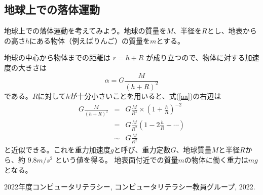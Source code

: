 \documentclass[platex,a4paper,12pt,dvipdfmx]{jsarticle}
\begin{document}
\subsection{地球上での落体運動}
地球上での落体運動を考えてみよう。地球の質量を$M$、半径を$R$とし、地表からの高さ$h$にある物体（例えばりんご）の質量を$m$とする。

地球の中心から物体までの距離は $ r = h + R $ が成り立つので、物体に対する加速度の大きさは
\begin{equation}
        \alpha = G \frac{M}{(h+R)^2}  \label{aa}
\end{equation}
である。$ R $に対して$ h $が十分小さいことを用いると、式(\ref{aa})の右辺は
\begin{eqnarray}
        G \frac{M}{(h+R)^2} &=& G \frac{M}{R^2} \times \left( 1 + \frac{h}{R} \right) ^{-2} \\
        &=& G \frac{M}{R^2} \left( 1 - 2 \frac{h}{R} + \cdots \right)  \\
        &\sim& G \frac{M}{R^2}
\end{eqnarray}
と近似できる。これを重力加速度$g$と呼び、重力定数$G$、地球質量$M$と半径$R$から、約 $ 9.8 m/s^2 $ という値を得る。
地表面付近での質量$m$の物体に働く重力は$mg$となる。


\begin{thebibliography}{99}
 2022年度コンピュータリテラシー, コンピュータリテラシー教員グループ, 2022.
\end{thebibliography}
\end{document}
